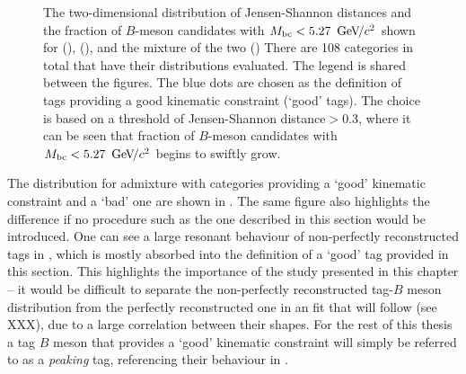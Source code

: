 \begin{figure}[htbp!]
    \centering
    \caption{\label{fig:good_tags_jsdists} The two-dimensional distribution of Jensen-Shannon distances and the fraction of $B$-meson candidates with ${M_{\mathrm{bc}}}<5.27~{\mathrm{\,Ge\kern -0.1em V\!/}c^2}$
    shown for \BptoXsgamma (), \BztoXsgamma (), and the mixture of the two ()
    There are 108 categories in total that have their \Mbc distributions evaluated.
    The legend is shared between the figures.
    The blue dots are chosen as the definition of tags providing a good kinematic constraint (`good' tags).
    The choice is based on a threshold of Jensen-Shannon distance$>0.3$, where it can be seen that fraction of $B$-meson candidates with ${M_{\mathrm{bc}}}<5.27~{\mathrm{\,Ge\kern -0.1em V\!/}c^2}$ begins to swiftly grow.
    }
\end{figure}

The \Mbc distribution for \BtoXsgamma admixture with categories providing a `good' kinematic constraint and a `bad' one are shown in .
The same figure also highlights the difference if no procedure such as the one described in this section would be introduced.
One can see a large resonant behaviour of non-perfectly reconstructed tags in , which is mostly absorbed into the definition of a `good' tag provided in this section.
This highlights the importance of the study presented in this chapter -- it would be difficult to separate the non-perfectly reconstructed tag-$B$ meson distribution from the perfectly reconstructed one in an \Mbc fit that will follow (see XXX), due to a large correlation between their shapes.
For the rest of this thesis a tag $B$ meson that provides a `good' kinematic constraint will simply be referred to as a \textit{peaking} tag, referencing their behaviour in \Mbc.

